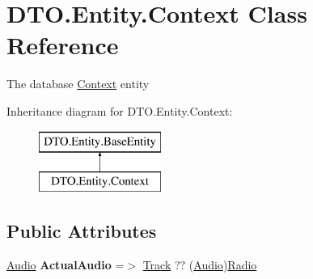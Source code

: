 \hypertarget{class_d_t_o_1_1_entity_1_1_context}{}\section{D\+T\+O.\+Entity.\+Context Class Reference}
\label{class_d_t_o_1_1_entity_1_1_context}


The database \hyperlink{class_d_t_o_1_1_entity_1_1_context}{Context} entity  


Inheritance diagram for D\+T\+O.\+Entity.\+Context\+:\begin{figure}[H]
\begin{center}
\leavevmode
\includegraphics[height=2.000000cm]{class_d_t_o_1_1_entity_1_1_context}
\end{center}
\end{figure}
\subsection*{Public Attributes}
\begin{DoxyCompactItemize}
\item 
\mbox{\label{class_d_t_o_1_1_entity_1_1_context_a5af319765cdba2ee3b63826ddcf77925}} 
\hyperlink{class_d_t_o_1_1_audio}{Audio} {\bfseries Actual\+Audio} =$>$ \hyperlink{class_d_t_o_1_1_entity_1_1_track}{Track} ?? (\hyperlink{class_d_t_o_1_1_audio}{Audio})\hyperlink{class_d_t_o_1_1_entity_1_1_radio}{Radio}
\end{DoxyCompactItemize}
